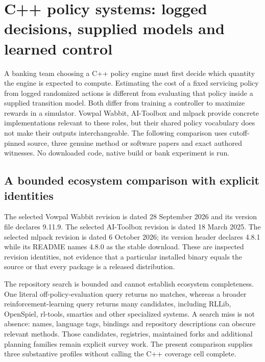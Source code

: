 \section{C++ policy systems: logged decisions, supplied models and learned control}
\label{sec:exec24-policy-cxx}
A banking team choosing a C++ policy engine must first decide which quantity the engine is expected to compute. Estimating the cost of a fixed servicing policy from logged randomized actions is different from evaluating that policy inside a supplied transition model. Both differ from training a controller to maximize rewards in a simulator. Vowpal Wabbit, AI-Toolbox and mlpack provide concrete implementations relevant to these roles, but their shared policy vocabulary does not make their outputs interchangeable. The following comparison uses cutoff-pinned source, three genuine method or software papers and exact authored witnesses. No downloaded code, native build or bank experiment is run.\citep{exec24_policycxx_vw,exec24_policycxx_aitoolbox,exec24_policycxx_mlpack,exec24_policycxx_comparison}

\subsection{A bounded ecosystem comparison with explicit identities}
The selected Vowpal Wabbit revision is dated 28 September 2026 and its version file declares 9.11.9. The selected AI-Toolbox revision is dated 18 March 2025. The selected mlpack revision is dated 6 October 2026; its version header declares 4.8.1 while its README names 4.8.0 as the stable download. These are inspected revision identities, not evidence that a particular installed binary equals the source or that every package is a released distribution.\citep{exec24_policycxx_vw,exec24_policycxx_aitoolbox,exec24_policycxx_mlpack}

The repository search is bounded and cannot establish ecosystem completeness. One literal off-policy-evaluation query returns no matches, whereas a broader reinforcement-learning query returns many candidates, including RLLib, OpenSpiel, rl-tools, smarties and other specialized systems. A search miss is not absence: names, language tags, bindings and repository descriptions can obscure relevant methods. Those candidates, registries, maintained forks and additional planning families remain explicit survey work. The present comparison supplies three substantive profiles without calling the C++ coverage cell complete.\citep{exec24_policycxx_comparison}

